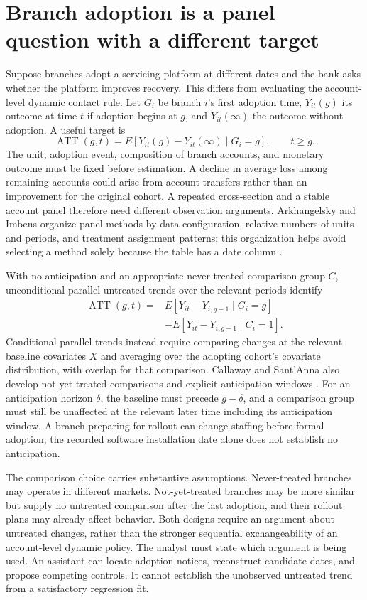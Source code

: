 \section{Branch adoption is a panel question with a different target}
\label{exec14:l5-panel}

Suppose branches adopt a servicing platform at different dates and the bank
asks whether the platform improves recovery. This differs from evaluating the
account-level dynamic contact rule. Let $G_i$ be branch $i$'s first adoption
time, $Y_{it}(g)$ its outcome at time $t$ if adoption begins at $g$, and
$Y_{it}(\infty)$ the outcome without adoption. A useful target is
\[
 \operatorname{ATT}(g,t)
 =E[Y_{it}(g)-Y_{it}(\infty)\mid G_i=g],\qquad t\geq g.
\]
The unit, adoption event, composition of branch accounts, and monetary outcome
must be fixed before estimation. A decline in average loss among remaining
accounts could arise from account transfers rather than an improvement for
the original cohort. A repeated cross-section and a stable account panel
therefore need different observation arguments. Arkhangelsky and Imbens
organize panel methods by data configuration, relative numbers of units and
periods, and treatment assignment patterns; this organization helps avoid
selecting a method solely because the table has a date column
\citep{panelreview2024}.

With no anticipation and an appropriate never-treated comparison group $C$,
unconditional parallel untreated trends over the relevant periods identify
\begin{align*}
 \operatorname{ATT}(g,t)
 ={}&E[Y_{it}-Y_{i,g-1}\mid G_i=g]\\
 &-E[Y_{it}-Y_{i,g-1}\mid C_i=1].
\end{align*}
Conditional parallel trends instead require comparing changes at the relevant
baseline covariates $X$ and averaging over the adopting cohort's covariate
distribution, with overlap for that comparison. Callaway and Sant'Anna also
develop not-yet-treated comparisons and explicit anticipation windows
\citep{callaway2021}. For an anticipation horizon $\delta$, the baseline must
precede $g-\delta$, and a comparison group must still be unaffected at the
relevant later time including its anticipation window. A branch preparing for
rollout can change staffing before formal adoption; the recorded software
installation date alone does not establish no anticipation.

The comparison choice carries substantive assumptions. Never-treated branches
may operate in different markets. Not-yet-treated branches may be more similar
but supply no untreated comparison after the last adoption, and their rollout
plans may already affect behavior. Both designs require an argument about
untreated changes, rather than the stronger sequential exchangeability of an
account-level dynamic policy. The analyst must state which argument is being
used. An assistant can locate adoption notices, reconstruct candidate dates,
and propose competing controls. It cannot establish the unobserved untreated
trend from a satisfactory regression fit.

